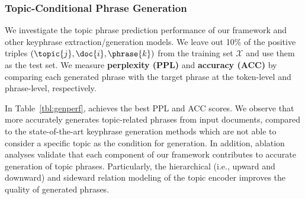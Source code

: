\subsubsection{Topic-Conditional Phrase Generation}
\label{subsubsec:ablation}
We investigate the topic phrase prediction performance of our framework and other keyphrase extraction/generation models.
We leave out 10\% of the positive triples $(\topic{j}, \doc{i}, \phrase{k})$ from the training set $\mathcal{X}$ and use them as the test set.
We measure \textbf{perplexity (PPL)} and \textbf{accuracy (ACC)} by comparing each generated phrase with the target phrase at the token-level and phrase-level, respectively.

In Table~\ref{tbl:genperf}, \proposed achieves the best PPL and ACC scores.
We observe that \proposed more accurately generates topic-related phrases from input documents, compared to the state-of-the-art keyphrase generation methods which are not able to consider a specific topic as the condition for generation.
In addition, ablation analyses validate that each component of our framework contributes to accurate generation of topic phrases. 
Particularly, the hierarchical (i.e., upward and downward) and sideward relation modeling of the topic encoder improves the quality of generated phrases.


